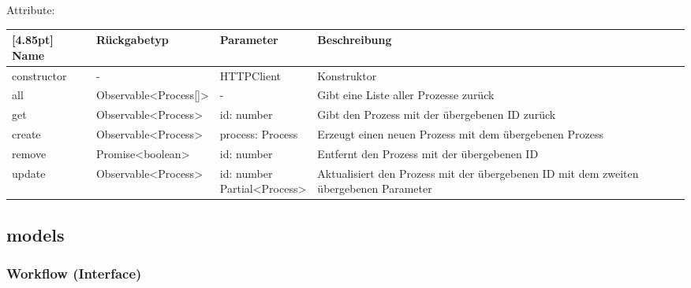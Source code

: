                 Attribute:
                \begin{center}
                \setlength\tabcolsep{5pt}
                	\renewcommand{\arraystretch}{1.5}
                    	\begin{tabularx}{\textwidth}{|l|l|l|X|}
                    	\hline
                    	\rowcolor[gray]{0.75}[4.85pt]
                		Name & Rückgabetyp & Parameter & Beschreibung \\ \hline 
                        constructor & - & HTTPClient & Konstruktor \\ \hline
                        all & Observable<Process[]> & - & Gibt eine Liste aller Prozesse zurück \\ \hline
                        get & Observable<Process> & id: number & Gibt den Prozess mit der übergebenen ID zurück \\ \hline
                        create & Observable<Process> & process: Process & Erzeugt einen neuen Prozess mit dem übergebenen Prozess \\ \hline
                        remove & Promise<boolean>  & id: number & Entfernt den Prozess mit der übergebenen ID \\ \hline
                        update & Observable<Process> & \thead{id: number\\Partial<Process>} & Aktualisiert den Prozess mit der übergebenen ID mit dem zweiten übergebenen Parameter \\ \hline
                	\end{tabularx}
                \end{center}
    
        \subsection{models}
            
    		\subsubsection{Workflow (Interface)}
    		
